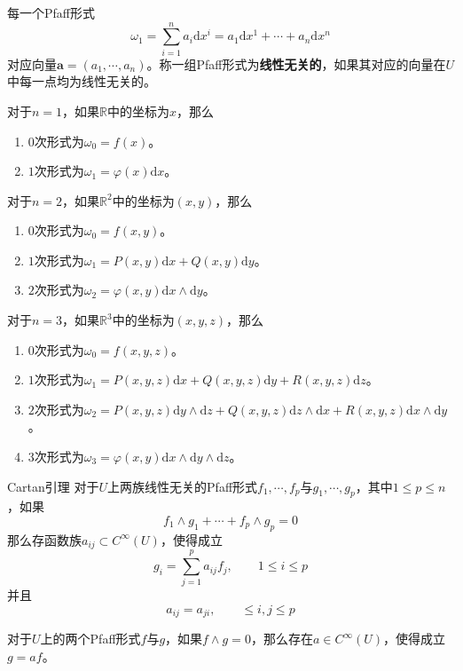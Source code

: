 \documentclass[lang = cn, scheme = chinese, thmcnt = section]{elegantbook}
\newcommand{\R}{\mathbb{R}}            %
\newcommand{\sub}{\subset}             %
\newcommand{\bs}{\boldsymbol}          %
\newcommand{\dd}{\mathrm{d}}           %
\begin{document}
每一个Pfaff形式
$$
\omega_1=\sum_{i=1}^{n}a_i\dd x^{i}
=a_1\dd x^{1}+\cdots+a_n\dd x^{n}
$$
对应向量$\bs{a}=(a_1,\cdots,a_n)$。称一组Pfaff形式为\textbf{线性无关的}，如果其对应的向量在$U$中每一点均为线性无关的。

\begin{example}
	对于$n=1$，如果$\R$中的坐标为$x$，那么
	\begin{enumerate}
		\item $0$次形式为$\omega_0=f(x)$。
		\item $1$次形式为$\omega_1=\varphi(x)\dd x$。
	\end{enumerate}
\end{example}

\begin{example}
	对于$n=2$，如果$\R^2$中的坐标为$(x,y)$，那么
	\begin{enumerate}
		\item $0$次形式为$\omega_0=f(x,y)$。
		\item $1$次形式为$\omega_1=P(x,y)\dd x+Q(x,y)\dd y$。
		\item $2$次形式为$\omega_2=\varphi(x,y)\dd x\wedge\dd y$。
	\end{enumerate}
\end{example}

\begin{example}
	对于$n=3$，如果$\R^3$中的坐标为$(x,y,z)$，那么
	\begin{enumerate}
		\item $0$次形式为$\omega_0=f(x,y,z)$。
		\item $1$次形式为$\omega_1=P(x,y,z)\dd x+Q(x,y,z)\dd y+R(x,y,z)\dd z$。
		\item $2$次形式为$\omega_2=P(x,y,z)\dd y\wedge \dd z+Q(x,y,z)\dd z\wedge \dd x+R(x,y,z)\dd x\wedge \dd y$。
		\item $3$次形式为$\omega_3=\varphi(x,y)\dd x\wedge\dd y\wedge \dd z$。
	\end{enumerate}
\end{example}

\begin{theorem}{Cartan引理}
	对于$U$上两族线性无关的Pfaff形式$f_1,\cdots,f_p$与$g_1,\cdots,g_p$，其中$1\le p \le n$，如果%
	$$
	f_1\wedge g_1+\cdots+f_p\wedge g_p=0
	$$
	那么存函数族$a_{ij}\sub C^\infty(U)$，使得成立%
	$$
	g_i=\sum_{j=1}^{p}a_{ij}f_j,\qquad 1\le i \le p
	$$
	并且%
	$$
	a_{ij}=a_{ji},\qquad \le i,j \le p
	$$
\end{theorem}

\begin{corollary}
	对于$U$上的两个Pfaff形式$f$与$g$，如果$f\wedge g=0$，那么存在$a\in C^\infty(U)$，使得成立$g=af$。
\end{corollary}
\end{document}
